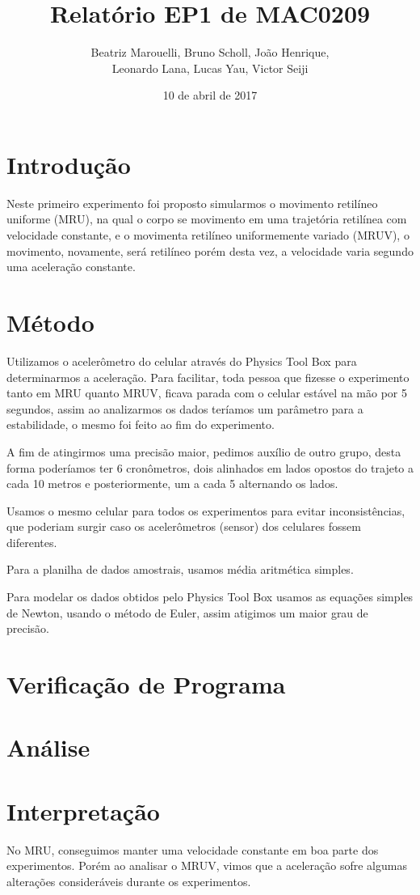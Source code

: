 \documentclass[a4paper, 12pt]{article}
\title{Relatório EP1 de MAC0209}
\author{Beatriz Marouelli, Bruno Scholl, João Henrique, 
\\ Leonardo Lana, Lucas Yau, Victor Seiji}
\date{10 de abril de 2017}
\begin{document}
\maketitle

\section*{Introdução}
Neste primeiro experimento foi proposto simularmos o movimento retilíneo
uniforme (MRU), na qual o corpo se movimento em uma trajetória retilínea com
velocidade constante, e o movimenta retilíneo uniformemente variado (MRUV),
o movimento, novamente, será retilíneo porém desta vez, a velocidade varia
segundo uma aceleração constante.

\section*{Método}
Utilizamos o acelerômetro do celular através do Physics Tool Box para
determinarmos a aceleração. Para facilitar, toda pessoa que fizesse o experimento 
tanto em MRU quanto MRUV, ficava parada com o celular estável na mão por 5 segundos, 
assim ao analizarmos os dados teríamos um parâmetro para a estabilidade, o mesmo 
foi feito ao fim do experimento.

A fim de atingirmos uma precisão maior, pedimos auxílio de outro grupo, desta
forma poderíamos ter 6 cronômetros, dois alinhados em lados opostos do trajeto
a cada 10 metros e posteriormente, um a cada 5 alternando os lados.

Usamos o mesmo celular para todos os experimentos para evitar inconsistências,
que poderiam surgir caso os acelerômetros (sensor) dos celulares fossem diferentes.

Para a planilha de dados amostrais, usamos média aritmética simples.

Para modelar os dados obtidos pelo Physics Tool Box usamos as equações simples
de Newton, usando o método de Euler, assim atigimos um maior grau de precisão.

\section*{Verificação de Programa}

\section*{Análise}

\section*{Interpretação}
No MRU, conseguimos manter uma velocidade constante em boa parte dos experimentos.
Porém ao analisar o MRUV, vimos que a aceleração sofre algumas alterações
consideráveis durante os experimentos.
\end{document}
